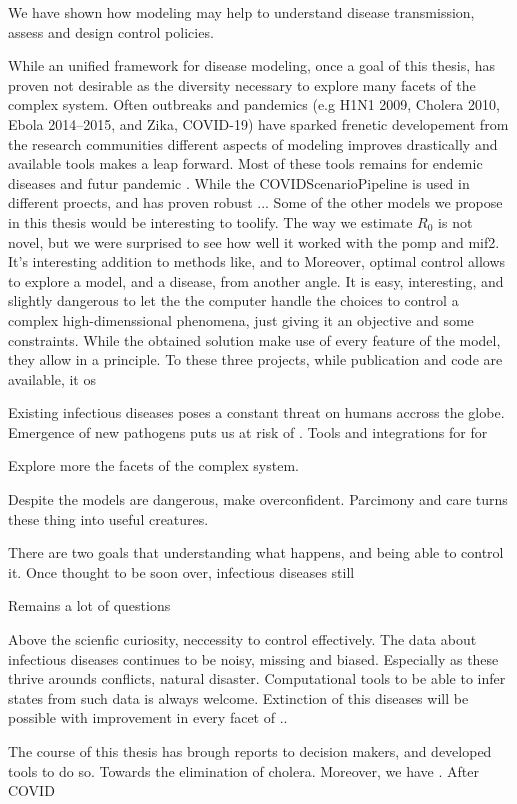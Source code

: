 We have shown how modeling may help to understand disease transmission, assess and design control policies. 

While an unified framework for disease modeling, once a goal of this thesis, has proven not desirable as the diversity necessary to explore many facets of the complex system. Often outbreaks and pandemics (e.g H1N1 2009, Cholera 2010, Ebola 2014--2015, and Zika, COVID-19) have sparked frenetic developement from the research communities different aspects of modeling improves drastically and available tools makes a leap forward. Most of these tools remains for endemic diseases and futur pandemic
. 
While the COVIDScenarioPipeline is used in different proects, and has proven robust ... Some of the other models we propose in this thesis would be interesting to toolify. The way we estimate $R_0$ is not novel, but we were surprised to see how well it worked with the pomp and mif2. It's interesting addition to methods like, and to 
Moreover, optimal control allows to explore a model, and a disease, from another angle. It is easy, interesting, and slightly dangerous to let the the computer handle the choices to control a complex high-dimenssional  phenomena, just giving it an objective and some constraints. While the obtained solution make use of every feature of the model, they allow in a principle.
To these three projects, while publication and code are available, it os

Existing infectious diseases poses a constant threat on humans accross the globe. Emergence of new pathogens puts us at risk of . Tools and integrations for for 

Explore more the facets of the complex system.

Despite the models are dangerous, make overconfident. Parcimony and care turns these thing into useful creatures.

There are two goals that understanding what happens, and being able to control it. Once thought to be soon over, infectious diseases still 

Remains a lot of questions 

Above the scienfic curiosity, neccessity to control effectively. The data about infectious diseases continues to be noisy, missing and biased. Especially as these thrive arounds conflicts, natural disaster. Computational tools to be able to infer states from such data is always welcome. Extinction of this diseases will be possible with improvement in every facet of ..

The course of this thesis has brough reports to decision makers, and developed tools to do so. Towards the elimination of cholera. Moreover, we have . After COVID